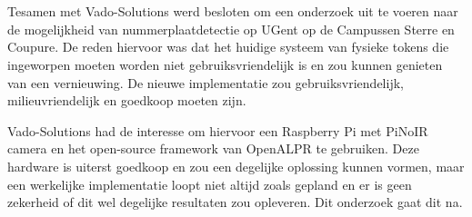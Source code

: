
%
%




\chapter*{}

Tesamen met Vado-Solutions werd besloten om een onderzoek uit te voeren naar de mogelijkheid van nummerplaatdetectie op UGent op de Campussen Sterre en Coupure. De reden hiervoor was dat het huidige systeem van fysieke tokens die ingeworpen moeten worden niet gebruiksvriendelijk is en zou kunnen genieten van een vernieuwing. De nieuwe implementatie zou gebruiksvriendelijk, milieuvriendelijk en goedkoop moeten zijn.

Vado-Solutions had de interesse om hiervoor een Raspberry Pi met PiNoIR camera en het open-source framework van OpenALPR te gebruiken. Deze hardware is uiterst goedkoop en zou een degelijke oplossing kunnen vormen, maar een werkelijke implementatie loopt niet altijd zoals gepland en er is geen zekerheid of dit wel degelijke resultaten zou opleveren. Dit onderzoek gaat dit na.

